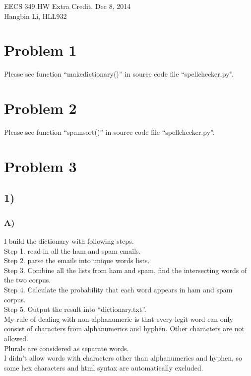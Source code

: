 \documentclass[10pt]{article}
\begin{document}
\begin{center}
EECS 349 HW Extra Credit, Dec 8, 2014 \\
Hangbin Li, HLL932
\end{center}

\section*{Problem 1}
Please see function ``makedictionary()'' in source code file ``spellchecker.py''.

\section*{Problem 2}
Please see function ``spamsort()'' in source code file ``spellchecker.py''.

\section*{Problem 3}
\subsection*{1)}
\subsubsection*{A)}
I build the dictionary with following steps.\\
Step 1. read in all the ham and spam emails.\\
Step 2. parse the emails into unique words lists.\\
Step 3. Combine all the lists from ham and spam, find the intersecting words of the two corpus.\\
Step 4. Calculate the probability that each word appears in ham and spam corpus.\\
Step 5. Output the result into ``dictionary.txt''.\\

\noindent My rule of dealing with non-alphanumeric is that every legit word can only consist of characters from alphanumerics and hyphen. Other characters are not allowed.\\

\noindent Plurals are considered as separate words.\\

\noindent I didn't allow words with characters other than alphanumerics and hyphen, so some hex characters and html syntax are automatically excluded.\\
\end{document}
